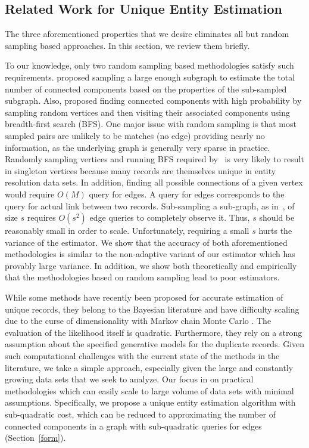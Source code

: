 \documentclass[aoas]{imsart}
\begin{document}
\subsection{Related Work for Unique Entity Estimation}
\label{sec:RelatedWork}

The three aforementioned properties that we desire eliminates all but random sampling based approaches. In this section, we review them briefly.

To our knowledge, only two random sampling based methodologies satisfy such requirements. \cite{1978paper} proposed sampling a large enough subgraph to estimate the total number of connected components based on the properties of the sub-sampled subgraph. Also, \cite{chazelle2005approximating} proposed finding connected components with high probability by sampling random vertices and then visiting their associated components using breadth-first search (BFS). One major issue with random sampling is that most sampled pairs are unlikely to be matches (no edge) providing nearly no information, as the underlying graph is generally very sparse in practice. Randomly sampling vertices and running BFS required by~\cite{chazelle2005approximating} is very likely to result in singleton vertices because many records are themselves unique in entity resolution data sets. In addition, finding all possible connections of a given vertex would require $O(M)$ query for edges. A query for edges corresponds  to the query for actual link between two records. Sub-sampling a sub-graph, as in~\cite{1978paper}, of size $s$ requires $O(s^2)$ edge queries to completely observe it. Thus, $s$ should be reasonably small in order to scale. Unfortunately, requiring a small $s$ hurts the variance of the estimator. We show that the accuracy of both aforementioned methodologies is similar to the non-adaptive variant of our estimator which has provably large variance. In addition, we show both theoretically and empirically that the methodologies based on random sampling lead to poor estimators.

While some methods have recently been proposed for accurate estimation of unique records, they belong to the Bayesian literature and have difficulty scaling due to the curse of dimensionality with Markov chain Monte Carlo \cite{steorts??bayesian, sadinle_2014, liseo_2011}. The evaluation of the likelihood itself is quadratic. Furthermore, they rely on a strong assumption about the specified generative models for the duplicate records. Given such computational challenges with the current state of the methods in the literature, we take a simple approach, especially given the large and constantly growing  data sets that we seek to analyze. Our focus in on practical methodologies which can easily scale to large volume of data sets with minimal assumptions. Specifically, we propose a unique entity estimation algorithm with sub-quadratic cost, which can be reduced to approximating the number of connected components in a graph with sub-quadratic queries for edges (Section~\ref{form}).
\end{document}

